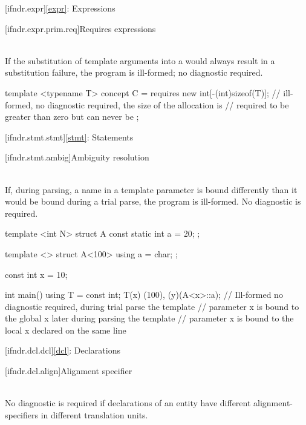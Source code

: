 [ifndr.expr]{\ref{expr}: Expressions}

[ifndr.expr.prim.req]{Requires expressions}

\pnum
{} \\
If the substitution of template arguments into a 
would always result in a substitution failure, the program is ill-formed; no diagnostic required.

\pnum
\begin{example}
\begin{codeblock}
template <typename T> concept C = requires {
  new int[-(int)sizeof(T)]; // ill-formed, no diagnostic required, the size of the allocation is
                            // required to be greater than zero but can never be
};
\end{codeblock}
\end{example}


[ifndr.stmt.stmt]{\ref{stmt}: Statements}

[ifndr.stmt.ambig]{Ambiguity resolution}

\pnum
{} \\
If, during
parsing, a name in a template parameter is bound differently than it would be bound during a trial parse,
the program is ill-formed. No diagnostic is required.

\pnum
\begin{example}
\begin{codeblock}
template <int N> struct A { const static int a = 20; };

template <> struct A<100> { using a = char; };

const int x = 10;

int main() {
  using T = const int;
  T(x)
  (100), (y)(A<x>::a); // Ill-formed no diagnostic required, during trial parse the template
                       // parameter x is bound to the global x later during parsing the template
                       // parameter x is bound to the local x declared on the same line
}
\end{codeblock}
\end{example}


[ifndr.dcl.dcl]{\ref{dcl}: Declarations}

[ifndr.dcl.align]{Alignment specifier}

\pnum
{} \\
No diagnostic is required if declarations of an entity have different alignment-specifiers in different
translation units.

